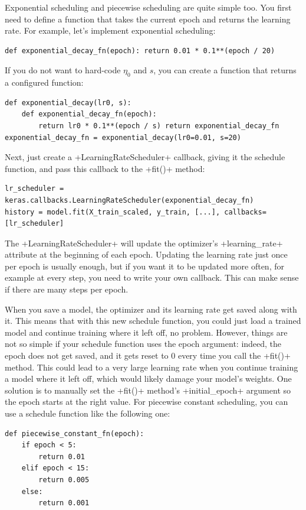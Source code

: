 Exponential scheduling and piecewise scheduling are quite simple too. You first need to define a function that takes the current epoch and returns the learning rate. For example, let's implement exponential scheduling:
\begin{lstlisting}
def exponential_decay_fn(epoch): return 0.01 * 0.1**(epoch / 20)
\end{lstlisting}
If you do not want to hard-code $\eta_0$ and $s$, you can create a function that returns a configured function:
\begin{lstlisting}
def exponential_decay(lr0, s):
	def exponential_decay_fn(epoch):
		return lr0 * 0.1**(epoch / s) return exponential_decay_fn
exponential_decay_fn = exponential_decay(lr0=0.01, s=20)
\end{lstlisting}
Next, just create a \cd+LearningRateScheduler+ callback, giving it the schedule function,
and pass this callback to the \cd+fit()+ method:
\begin{lstlisting}
lr_scheduler = keras.callbacks.LearningRateScheduler(exponential_decay_fn)
history = model.fit(X_train_scaled, y_train, [...], callbacks=[lr_scheduler]
\end{lstlisting}
The \cd+LearningRateScheduler+ will update the optimizer's \cd+learning_rate+ attribute at the beginning of each epoch. Updating the learning rate just once per epoch is usually enough, but if you want it to be updated more often, for example at every step, you need to write your own callback. This can make sense if there are many steps per epoch.

When you save a model, the optimizer and its learning rate get saved along with it. This means that with this new schedule function, you could just load a trained model and continue training where it left off, no problem. However, things are not so simple if your schedule function uses the epoch argument: indeed, the epoch does not get saved, and it gets reset to $0$ every time you call the \cd+fit()+ method. This could lead to a very large learning rate when you continue training a model where it left off, which would likely damage your model's weights. One solution is to manually set the \cd+fit()+ method's \cd+initial_epoch+ argument so the epoch starts at the right value. For piecewise constant scheduling, you can use a schedule function like the following one:
\begin{lstlisting}
def piecewise_constant_fn(epoch):
	if epoch < 5:
		return 0.01 
	elif epoch < 15: 
		return 0.005
	else:
		return 0.001
\end{lstlisting}

